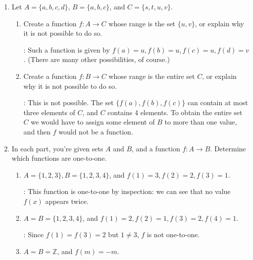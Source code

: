 \documentclass[12pt]{article}
\newcommand{\points}[1]{\marginpar{\hspace{24pt}[#1]}}
\newcommand{\Z}{\mathbb{Z}}
\begin{document}
\thispagestyle{fancy}

 \begin{enumerate}
 \item Let $A=\{a,b,c,d\}$, $B=\{a,b,c\}$, and $C=\{s,t,u,v\}$.
\begin{enumerate}
 \item Create a function $f:A\to C$ whose range is the set $\{u,v\}$, or explain why it is not possible to do so. \points{2}

\bigskip

: Such a function is given by $f(a)=u, f(b)=u, f(c)=u, f(d)=v$. (There are many other possibilities, of course.)

\bigskip


 \item Create a function $f:B\to C$ whose range is the entire set $C$, or explain why it is not possible to do so. \points{2}

\bigskip

: This is not possible. The set $\{f(a),f(b),f(c)\}$ can contain at most three elements of $C$, and $C$ contains 4 elements. To obtain the entire set $C$ we would have to assign some element of $B$ to more than one value, and then $f$ would not be a function.
\end{enumerate}
\item In each part, you're given sets $A$ and $B$, and a function $f:A\to B$. Determine which functions are one-to-one.
\begin{enumerate}
 \item $A=\{1,2,3\}, B=\{1,2,3,4\}$, and $f(1)=3, f(2)=2, f(3)=1$.\points{1}

\bigskip

: This function is one-to-one by inspection: we can see that no value $f(x)$ appears twice.

\bigskip

 \item $A=B=\{1,2,3,4\}$, and $f(1)=2, f(2)=1, f(3)=2, f(4)=1$.\points{1}

\bigskip

: Since $f(1)=f(3)=2$ but $1\neq 3$, $f$ is not one-to-one.

\bigskip


 \item $A=B=\Z$, and $f(m)=-m$.\points{2}


\end{enumerate}
\end{enumerate}
\end{document}
